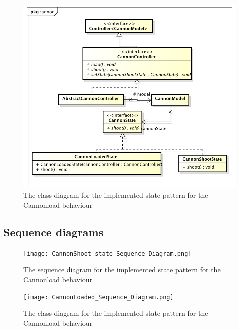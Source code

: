 \documentclass[a4paper]{article}
\begin{document}
\begin{figure}[H]
    \includegraphics[width=1.0\textwidth]{CannonStateDiagram.png}
    \caption{\label{fig:class_state} The class diagram for the implemented state pattern for the Cannonload behaviour}
\end{figure}

\subsection{Sequence diagrams}
\begin{figure}[H]
  \texttt{[image: CannonShoot\_state\_Sequence\_Diagram.png]}
    \caption{\label{fig:sequence_state1} The sequence diagram for the implemented state pattern for the Cannonload behaviour}
\end{figure}

\begin{figure}[H]
 \texttt{[image: CannonLoaded\_Sequence\_Diagram.png]}
	\caption{\label{fig:sequence_state2} The class diagram for the implemented state pattern for the Cannonload behaviour}
\end{figure}
\end{document}
